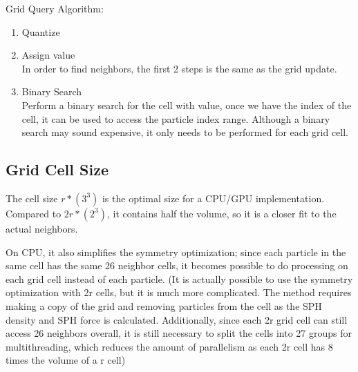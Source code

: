\documentclass[]{article}
\begin{document}
			Grid Query Algorithm:
			\begin{enumerate}
				\item Quantize
				\item Assign value\\
				In order to find neighbors, the first 2 steps is the same as the grid update.
				\item Binary Search\\
				Perform a binary search for the cell with value, once we have the index of the cell, it
				can be used to access the particle index range. Although a binary search may sound expensive, 
				it only needs to be performed for each grid cell.
			\end{enumerate}
			
			
	\subsection{Grid Cell Size}
		The cell size \(r * (3^3)\) is the optimal size for a CPU/GPU implementation.
		Compared to \(2r * (2^3)\), it contains half the volume, so it is a closer fit to the actual neighbors.
		
		On CPU, it also simplifies the symmetry optimization; since each particle in the same cell has the same
		26 neighbor cells, it becomes possible to do processing on each grid cell instead of each particle.
		(It is actually possible to use the symmetry optimization with 2r cells, but it is much more complicated.
		The method requires making a copy of the grid and removing particles from the cell as the SPH density 
		and SPH force is calculated. Additionally, since each 2r grid cell can still access 26 neighbors overall,
		it is still necessary to split the cells into 27 groups for multithreading, which reduces the amount of
		parallelism as each 2r cell has 8 times the volume of a r cell)
	
\end{document}
